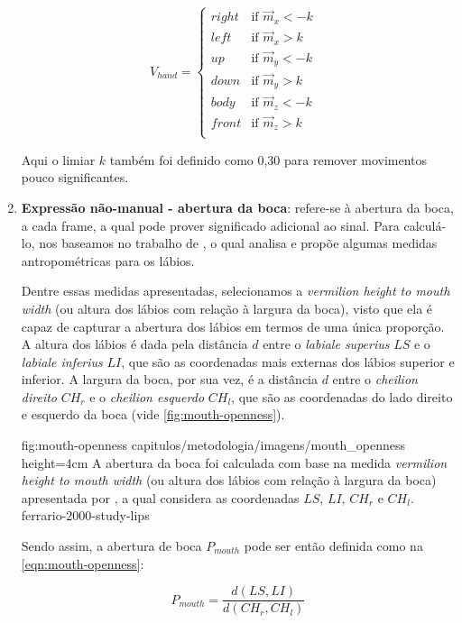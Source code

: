 \begin{enumerate}
    \begin{equation}
    \label{eqn:hand-movement-directions}
        V_{hand} =
            \begin{cases}
                right & \text{if $\overrightarrow{m}_x < {-k}$ }\\
                left  & \text{if $\overrightarrow{m}_x > {k}$ }\\
                up    & \text{if $\overrightarrow{m}_y < {-k}$ }\\
                down  & \text{if $\overrightarrow{m}_y > {k}$ }\\
                body  & \text{if $\overrightarrow{m}_z < {-k}$ }\\
                front & \text{if $\overrightarrow{m}_z > {k}$ }\\
            \end{cases}    
    \end{equation}

    Aqui o limiar \(k\) também foi definido como 0,30 para remover movimentos pouco significantes.


    \item \textbf{Expressão não-manual - abertura da boca}: refere-se à abertura da boca, a cada frame, a qual pode prover significado adicional ao sinal.
    Para calculá-lo, nos baseamos no trabalho de , o qual analisa e propõe algumas medidas antropométricas para os lábios.

    Dentre essas medidas apresentadas, selecionamos a \textit{vermilion height to mouth width} (ou altura dos lábios com relação à largura da boca), visto que ela é capaz de capturar a abertura dos lábios em termos de uma única proporção. A altura dos lábios é dada pela distância \(d\) entre o \textit{labiale superius} \(LS\) e o \textit{labiale inferius} \(LI\), que são as coordenadas mais externas dos lábios superior e inferior. A largura da boca, por sua vez, é a distância \(d\) entre o \textit{cheilion direito} \(CH_r\) e o \textit{cheilion esquerdo} \(CH_l\), que são as coordenadas do lado direito e esquerdo da boca (vide \autoref{fig:mouth-openness}).

    \figura
        {fig:mouth-openness} %
        {capitulos/metodologia/imagens/mouth_openness} %
        {height=4cm} %
        {A abertura da boca foi calculada com base na medida \textit{vermilion height to mouth width} (ou altura dos lábios com relação à largura da boca) apresentada por \cite{ferrario-2000-study-lips}, a qual considera as coordenadas \(LS\), \(LI\), \(CH_r\) e \(CH_l\).} %
        {ferrario-2000-study-lips} %

        
    Sendo assim, a abertura de boca \(P_{mouth}\) pode ser então definida como na \autoref{eqn:mouth-openness}:

    \begin{equation}
        \label{eqn:mouth-openness}
        P_{mouth} = \frac{d(LS, LI)}{d(CH_r, CH_l)}
    \end{equation}

\end{enumerate}


